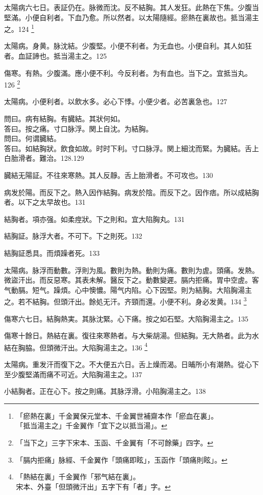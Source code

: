 太陽病六七日。表証仍在。脉微而沈。反不結胸。其人发狂。此熱在下焦。少腹当堅滿。小便自利者。下血乃愈。所以然者。以太陽隨經。瘀熱在裏故也。抵当湯主之。124
	\footnote{「瘀熱在裏」千金翼保元堂本、千金翼世補齋本作「瘀血在裏」。\\「抵当湯主之」千金翼作「宜下之以抵当湯」。}

太陽病。身黄。脉沈結。少腹堅。小便不利者。为无血也。小便自利。其人如狂者。血証諦也。抵当湯主之。125

傷寒。有熱。少腹滿。應小便不利。今反利者。为有血也。当下之。宜抵当丸。126
	\footnote{「当下之」三字下宋本、玉函、千金翼有「不可餘藥」四字。}

太陽病。小便利者。以飲水多。必心下悸。小便少者。必苦裏急也。127

問曰。病有結胸。有臓結。其狀何如。\\
答曰。按之痛。寸口脉浮。関上自沈。为結胸。\\
問曰。何谓臓結。\\
答曰。如結胸狀。飲食如故。时时下利。寸口脉浮。関上細沈而緊。为臓結。舌上白胎滑者。難治。128.129

臓結无陽証。不往來寒熱。其人反靜。舌上胎滑者。不可攻也。130

病发於陽。而反下之。熱入因作結胸。病发於陰。而反下之。因作痞。所以成結胸者。以下之太早故也。131

結胸者。項亦强。如柔痙狀。下之則和。宜大陷胸丸。131

結胸証。脉浮大者。不可下。下之則死。132

結胸証悉具。而煩躁者死。133

太陽病。脉浮而動數。浮則为風。數則为熱。動則为痛。數則为虗。頭痛。发熱。微盜汗出。而反惡寒。其表未解。醫反下之。動數變遲。膈内拒痛。胃中空虗。客气動膈。短气。躁煩。心中懊憹。陽气内陷。心下因堅。則为結胸。大陷胸湯主之。若不結胸。但頭汗出。餘処无汗。齐頸而還。小便不利。身必发黄。134
	\footnote{「膈内拒痛」脉經、千金翼作「頭痛即眩」，玉函作「頭痛則眩」。}

傷寒六七日。結胸熱実。其脉沈緊。心下痛。按之如石堅。大陷胸湯主之。135

傷寒十餘日。熱結在裏。復往來寒熱者。与大柴胡湯。但結胸。无大熱者。此为水結在胸脇。{\khaaitp 但}頭微汗出。大陷胸湯主之。136
	\footnote{「熱結在裏」千金翼作「邪气結在裏」。\\宋本、外臺「但頭微汗出」五字下有「者」字。}

太陽病。重发汗而復下之。不大便五六日。舌上燥而渴。日晡所小有潮熱。從心下至少腹堅滿而痛不可近。大陷胸湯主之。137

小結胸者。正在心下。按之則痛。其脉浮滑。小陷胸湯主之。138

